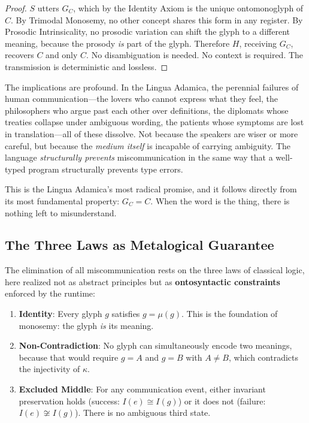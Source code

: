 \documentclass[12pt, letterpaper]{book}
\def\equiv{=}%
\def\mathfrak#1{#1}%
\begin{document}
\begin{proof}
$S$ utters $G_C$, which by the Identity Axiom is the unique ontomonoglyph of $C$. By Trimodal Monosemy, no other concept shares this form in any register. By Prosodic Intrinsicality, no prosodic variation can shift the glyph to a different meaning, because the prosody \textit{is} part of the glyph. Therefore $H$, receiving $G_C$, recovers $C$ and only $C$. No disambiguation is needed. No context is required. The transmission is deterministic and lossless.
\end{proof}

The implications are profound. In the Lingua Adamica, the perennial failures of human communication---the lovers who cannot express what they feel, the philosophers who argue past each other over definitions, the diplomats whose treaties collapse under ambiguous wording, the patients whose symptoms are lost in translation---all of these dissolve. Not because the speakers are wiser or more careful, but because the \textit{medium itself} is incapable of carrying ambiguity. The language \textit{structurally prevents} miscommunication in the same way that a well-typed program structurally prevents type errors.

This is the Lingua Adamica's most radical promise, and it follows directly from its most fundamental property: $G_C \equiv C$. When the word is the thing, there is nothing left to misunderstand.

\subsection{The Three Laws as Metalogical Guarantee}

The elimination of all miscommunication rests on the three laws of classical logic, here realized not as abstract principles but as \textbf{ontosyntactic constraints} enforced by the runtime:

\begin{enumerate}[label=(\roman*)]
    \item \textbf{Identity}: Every glyph $\mathfrak{g}$ satisfies $\mathfrak{g} \equiv \mu(\mathfrak{g})$. This is the foundation of monosemy: the glyph \textit{is} its meaning.
    \item \textbf{Non-Contradiction}: No glyph can simultaneously encode two meanings, because that would require $\mathfrak{g} \equiv A$ and $\mathfrak{g} \equiv B$ with $A \neq B$, which contradicts the injectivity of $\kappa$.
    \item \textbf{Excluded Middle}: For any communication event, either invariant preservation holds (success: $I(e) \cong I(\mathfrak{g})$) or it does not (failure: $I(e) \not\cong I(\mathfrak{g})$). There is no ambiguous third state.
\end{enumerate}
\end{document}

